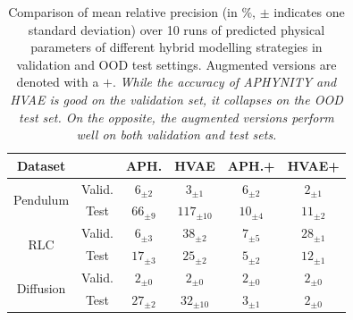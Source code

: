 \documentclass{article}
\begin{document}
\begin{table}[]
    \small
    \centering
    \setlength{\tabcolsep}{4pt}
    \begin{tabular}{c c|c c | c c}
        Dataset & & APH. & HVAE & APH.+ & HVAE+ \\ \hline
       \multirow{2}{*}{Pendulum} & Valid. & $6_{\pm 2}$ & $3_{\pm 1}$ & $6_{\pm 2}$ & $2_{\pm 1}$ \\
        & Test & $66_{\pm 9}$ & $117_{\pm 10}$ & $10_{\pm 4}$ & $11_{\pm 2}$    \\ \hline
       \multirow{2}{*}{RLC} & Valid. & $6_{\pm 3}$ & $38_{\pm 2}$ & $7_{\pm 5}$ & $28_{\pm 1}$ \\
        & Test & $17_{\pm 3}$ & $25_{\pm 2}$ & $5_{\pm 2}$ & $12_{\pm 1}$ \\ \hline
        
       \multirow{2}{*}{Diffusion} & Valid. & $2_{\pm 0}$ & $2_{\pm 0}$ & $2_{\pm 0}$ & $2_{\pm 0}$ \\
        & Test & $27_{\pm 2}$ & $32_{\pm 10}$ & $3_{\pm 1}$ & $2_{\pm 0}$\\ \hline
    \end{tabular}
    \caption{Comparison of mean relative precision (in $\%$, $\pm$ indicates one standard deviation) over 10 runs of predicted physical parameters of different hybrid modelling strategies in validation and OOD test settings. Augmented versions are denoted with a $+$. \textit{While the accuracy of APHYNITY and HVAE is good on the validation set, it collapses on the OOD test set. On the opposite, the augmented versions perform well on both validation and test sets.}}
    \label{tab:param_acc}
    \vspace{-1.5em}
\end{table}
\end{document}
